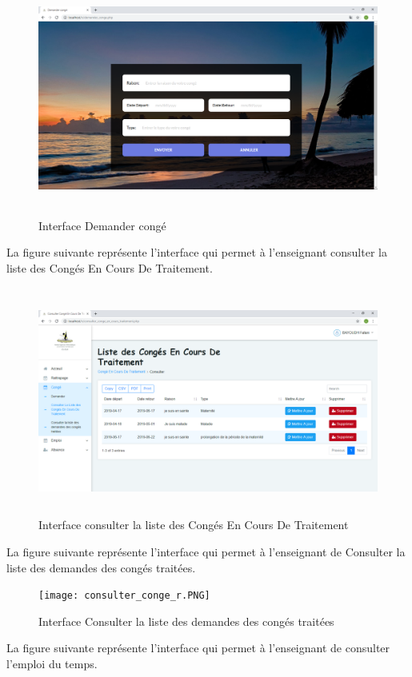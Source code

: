 \documentclass[12 pt]{report}
\begin{document}
\begin{figure}[h]
 \begin{center}
\includegraphics[width= 15 cm ,height=  7.7cm]{demander_conge.PNG}
\caption{Interface Demander congé}

\end{center}
\end{figure}
\newpage
La figure suivante représente l'interface qui permet à l'enseignant consulter la liste des Congés En Cours De Traitement.

\begin{figure}[h]
 \begin{center}
\includegraphics[width= 18 cm ,height=  7.5cm]{consulter_conge_t.PNG}
\caption{Interface consulter la liste des Congés En Cours De Traitement}

\end{center}
\end{figure}
La figure suivante représente l'interface qui permet à l'enseignant de Consulter la liste des demandes des congés traitées.

\begin{figure}[h]
 \begin{center}
\texttt{[image: consulter\_conge\_r.PNG]}
\caption{Interface Consulter la liste des demandes des congés traitées}

\end{center}
\end{figure}
\newpage
La figure suivante représente l'interface qui permet à l'enseignant de consulter l'emploi du temps.
\end{document}
